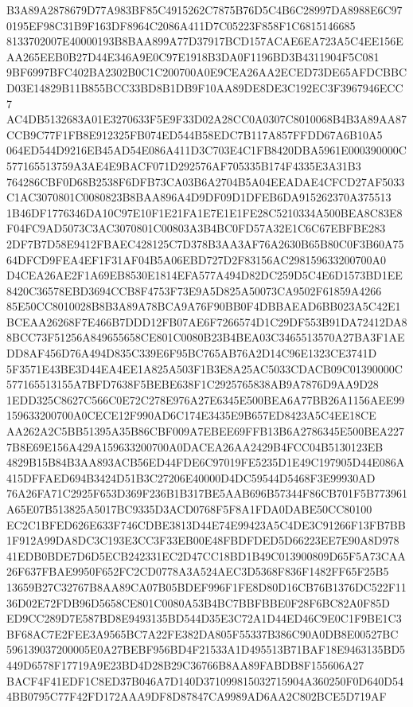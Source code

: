\documentclass[UTF8,fontset=fandol,zihao=-4,a4paper]{ctexart}
\begin{document}
{{B3A89A2878679D77A983BF85C4915262C7875B76D5C4B6C28997DA8988E6C970195EF98C31B9F163DF8964C2086A411D7C05223F858F1C6815146685
8133702007E40000193B8BAA899A77D37917BCD157ACAE6EA723A5C4EE156EAA265EEB0B27D44E346A9E0C97E1918B3DA0F1196BD3B4311904F5C081
9BF6997BFC402BA2302B0C1C200700A0E9CEA26AA2ECED73DE65AFDCBBCD03E14829B11B855BCC33BD8B1DB9F10AA89DE8DE3C192EC3F3967946ECC7
AC4DB5132683A01E3270633F5E9F33D02A28CC0A0307C8010068B4B3A89AA87CCB9C77F1FB8E912325FB074ED544B58EDC7B117A857FFDD67A6B10A5
064ED544D9216EB45AD54E086A411D3C703E4C1FB8420DBA5961E000390000C577165513759A3AE4E9BACF071D292576AF705335B174F4335E3A31B3
764286CBF0D68B2538F6DFB73CA03B6A2704B5A04EEADAE4CFCD27AF5033C1AC3070801C0080823B8BAA896A4D9DF09D1DFEB6DA915262370A375513
1B46DF1776346DA10C97E10F1E21FA1E7E1E1FE28C5210334A500BEA8C83E8F04FC9AD5073C3AC3070801C00803A3B4BC0FD57A32E1C6C67EBFBE283
2DF7B7D58E9412FBAEC428125C7D378B3AA3AF76A2630B65B80C0F3B60A7564DFCD9FEA4EF1F31AF04B5A06EBD727D2F83156AC298159633200700A0
D4CEA26AE2F1A69EB8530E1814EFA577A494D82DC259D5C4E6D1573BD1EE8420C36578EBD3694CCB8F4753F73E9A5D825A50073CA9502F61859A4266
85E50CC8010028B8B3A89A78BCA9A76F90BB0F4DBBAEAD6BB023A5C42E1BCEAA26268F7E466B7DDD12FB07AE6F7266574D1C29DF553B91DA72412DA8
8BCC73F51256A849655658CE801C0080B23B4BEA03C3465513570A27BA3F1AEDD8AF456D76A494D835C339E6F95BC765AB76A2D14C96E1323CE3741D
5F3571E43BE3D44EA4EE1A825A503F1B3E8A25AC5033CDACB09C01390000C577165513155A7BFD7638F5BEBE638F1C2925765838AB9A7876D9AA9D28
1EDD325C8627C566C0E72C278E976A27E6345E500BEA6A77BB26A1156AEE99159633200700A0CECE12F990AD6C174E3435E9B657ED8423A5C4EE18CE
AA262A2C5BB51395A35B86CBF009A7EBEE69FFB13B6A2786345E500BEA2277B8E69E156A429A159633200700A0DACEA26AA2429B4FCC04B5130123EB
4829B15B84B3AA893ACB56ED44FDE6C97019FE5235D1E49C197905D44E086A415DFFAED694B3424D51B3C27206E40000D4DC59544D5468F3E99930AD
76A26FA71C2925F653D369F236B1B317BE5AAB696B57344F86CB701F5B773961A65E07B513825A5017BC9335D3ACD0768F5F8A1FDA0DABE50CC80100
EC2C1BFED626E633F746CDBE3813D44E74E99423A5C4DE3C91266F13FB7BB1F912A99DA8DC3C193E3CC3F33EB00E48FBDFDED5D66223EE7E90A8D978
41EDB0BDE7D6D5ECB242331EC2D47CC18BD1B49C013900809D65F5A73CAA26F637FBAE9950F652FC2CD0778A3A524AEC3D5368F836F1482FF65F25B5
13659B27C32767B8AA89CA07B05BDEF996F1FE8D80D16CB76B1376DC522F1136D02E72FDB96D5658CE801C0080A53B4BC7BBFBBE0F28F6BC82A0F85D
ED9CC289D7E587BD8E9493135BD544D35E3C72A1D44ED46C9E0C1F9BE1C3BF68AC7E2FEE3A9565BC7A22FE382DA805F55337B386C90A0DB8E00527BC
596139037200005E0A27BEBF956BD4F21533A1D495513B71BAF18E9463135BD5449D6578F17719A9E23BD4D28B29C36766B8AA89FABDB8F155606A27
BACF4F41EDF1C8ED37B046A7D140D371099815032715904A360250F0D640D544BB0795C77F42FD172AAA9DF8D87847CA9989AD6AA2C802BCE5D719AF
}}
\end{document}
